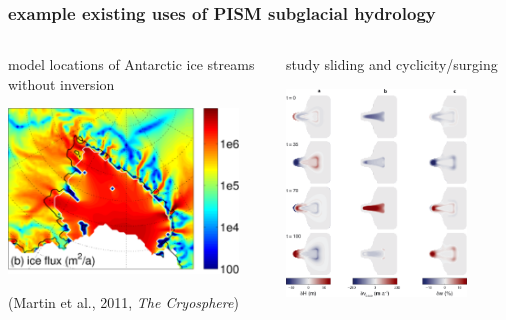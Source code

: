 \documentclass[hide notes,intlimits]{beamer}
\begin{document}
\begin{frame}
  \frametitle{example existing uses of PISM subglacial hydrology}

\begin{columns}
\begin{column}{0.5\textwidth}
\begin{center}
model locations of Antarctic ice streams without inversion

\vspace{10mm}

\includegraphics[width=0.9\textwidth]{martin-fig12}

\vspace{7mm}

\medskip
\scriptsize (Martin et al., 2011, \emph{The Cryosphere})
\end{center}
\end{column}
\begin{column}{0.5\textwidth}
\begin{center}
study sliding and cyclicity/surging

\bigskip
\includegraphics[width=0.8\textwidth]{vanPeltOerlemans-fig4}


\end{center}
\end{column}
\end{columns}
\end{frame}
\end{document}
